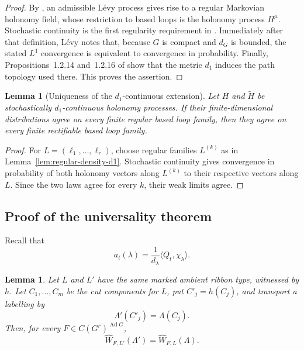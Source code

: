 \documentclass[11pt,a4paper,reqno]{article}
\newtheorem{lemma}[theorem]{Lemma}
\theoremstyle{definition}
\theoremstyle{remark}
\begin{document}
\begin{proof}
By \cite[Theorem~4.3.1]{Lev10}, an admissible L\'evy process gives rise to a regular Markovian holonomy field, whose restriction to based loops is the holonomy process $H^\mu$. Stochastic continuity is the first regularity requirement in \cite[Definition~3.1.3]{Lev10}. Immediately after that definition, L\'evy notes that, because $G$ is compact and $d_G$ is bounded, the stated $L^1$ convergence is equivalent to convergence in probability. Finally, Propositions~1.2.14 and~1.2.16 of \cite{Lev10} show that the metric $d_1$ induces the path topology used there. This proves the assertion.
\end{proof}

\begin{lemma}[Uniqueness of the $d_1$-continuous extension]\label{lem:unique-d1-extension}
Let $H$ and $\widetilde H$ be stochastically $d_1$-continuous holonomy processes. If their finite-dimensional distributions agree on every finite regular based loop family, then they agree on every finite rectifiable based loop family.
\end{lemma}

\begin{proof}
For $L=(\ell_1,\ldots,\ell_r)$, choose regular families $L^{(k)}$ as in Lemma~\ref{lem:regular-density-d1}. Stochastic continuity gives convergence in probability of both holonomy vectors along $L^{(k)}$ to their respective vectors along $L$. Since the two laws agree for every $k$, their weak limits agree.
\end{proof}

\subsection{Proof of the universality theorem}

Recall that
\[
 a_t(\lambda)
 =
 \frac1{d_\lambda}\langle Q_t,\chi_\lambda\rangle.
\]

\begin{lemma}\label{lem:topological-coefficient-marked-invariance}
Let $L$ and $L'$ have the same marked ambient ribbon type, witnessed by $h$. Let $C_1,\ldots,C_m$ be the cut components for $L$, put $C'_j=h(C_j)$, and transport a labelling by
\[
 \Lambda'(C'_j)=\Lambda(C_j).
\]
Then, for every $F\in C(G^r)^{\operatorname{Ad}G}$,
\[
 \widehat W_{F,L'}(\Lambda')
 =
 \widehat W_{F,L}(\Lambda).
\]
\end{lemma}
\end{document}
